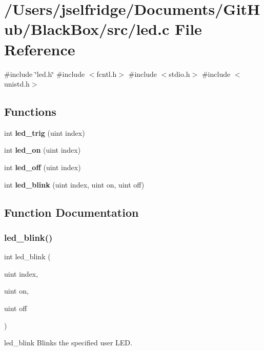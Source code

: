 \section{/\+Users/jselfridge/\+Documents/\+Git\+Hub/\+Black\+Box/src/led.c File Reference}
\label{led_8c}
{\ttfamily \#include \char`\"{}led.\+h\char`\"{}}\newline
{\ttfamily \#include $<$fcntl.\+h$>$}\newline
{\ttfamily \#include $<$stdio.\+h$>$}\newline
{\ttfamily \#include $<$unistd.\+h$>$}\newline
\subsection*{Functions}
\begin{DoxyCompactItemize}
\item 
int \textbf{ led\+\_\+trig} (uint index)
\item 
int \textbf{ led\+\_\+on} (uint index)
\item 
int \textbf{ led\+\_\+off} (uint index)
\item 
int \textbf{ led\+\_\+blink} (uint index, uint on, uint off)
\end{DoxyCompactItemize}


\subsection{Function Documentation}
\mbox{\label{led_8c_af94e27b5792d301ea095431a43c22078}} 
\subsubsection{led\+\_\+blink()}
{\footnotesize\ttfamily int led\+\_\+blink (\begin{DoxyParamCaption}\item[{uint}]{index,  }\item[{uint}]{on,  }\item[{uint}]{off }\end{DoxyParamCaption})}

led\+\_\+blink Blinks the specified user L\+ED. \mbox{\label{led_8c_a1519411ed65d1afbe5a20774b47b5b50}} 
